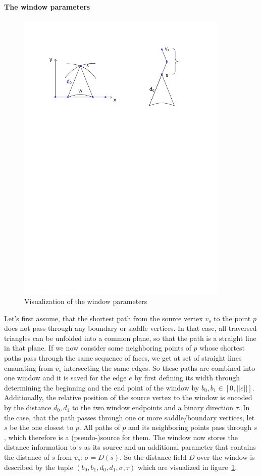 \paragraph{The window parameters}
\begin{figure}[h]
	\centering
	\includegraphics[width = 0.9\textwidth]{pictures/geodesics_parameters}
	\caption{Visualization of the window parameters}
	\label{fig:geo_param}
\end{figure}
Let's first assume, that the shortest path from the source vertex $v_s$ to the point $p$ does not pass through any boundary or saddle vertices.
In that case, all traversed triangles can be unfolded into a common plane, so that the path is a straight line in that plane.
If we now consider some neighboring points of $p$ whose shortest paths pass through the same sequence of faces, we get at set of straight lines emanating from $v_s$ intersecting the same edges.
So these paths are combined into one window and it is saved for the edge $e$ by first defining its width through determining the beginning and the end point of the window by $b_0, b_1 \in [0,||e||]$.
Additionally, the relative position of the source vertex to the window is encoded by the distance $d_0,d_1$ to the two window endpoints and a binary direction $\tau$.
In the case, that the path passes through one or more saddle/boundary vertices, let $s$ be the one closest to $p$.
All paths of $p$ and its neighboring points pass through $s$, which therefore is a (pseudo-)source for them.
The window now stores the distance information to $s$ as its source and an additional parameter that contains the distance of $s$ from $v_s$: $\sigma = D(s)$.
So the distance field $D$ over the window is described by the tuple $(b_0,b_1,d_0,d_1,\sigma,\tau)$ which are visualized in figure~\ref{fig:geo_param}.

